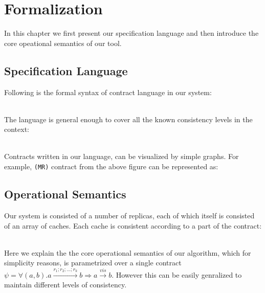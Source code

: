 \section{Formalization}
In this chapter we first present our specification language and then
introduce the core opeational semantics of our tool.
\subsection{Specification Language}
Following is the formal syntax of contract language in our system:

\\ The language is general enough to cover all  the known consistency
levels in the context:

\\ Contracts written in our language, can be visualized by simple graphs. For example, \texttt{(MR)} contract from the above figure can be represented as:



\newpage
\subsection{Operational Semantics}
Our system is consisted of a number of replicas, each of which itself is consisted of an array of caches. Each cache is consistent according to a part of the contract:

\\ Here we explain the the core operational semantics of our algorithm, which for simplicity reasons, 
is parametrized over a single contract 
$\psi = \forall (a,b). a \xrightarrow{r_1;r_2;...;r_k} b  \Rightarrow a \xrightarrow{vis} b$. 
However this can be easily  genralized to maintain different levels of consistency. 

